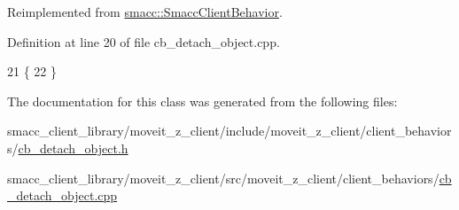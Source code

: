 Reimplemented from \hyperlink{classsmacc_1_1SmaccClientBehavior_ac0cd72d42bd00425362a97c9803ecce5}{smacc\+::\+Smacc\+Client\+Behavior}.



Definition at line 20 of file cb\+\_\+detach\+\_\+object.\+cpp.


\begin{DoxyCode}
21     \{
22     \}
\end{DoxyCode}


The documentation for this class was generated from the following files\+:\begin{DoxyCompactItemize}
\item 
smacc\+\_\+client\+\_\+library/moveit\+\_\+z\+\_\+client/include/moveit\+\_\+z\+\_\+client/client\+\_\+behaviors/\hyperlink{cb__detach__object_8h}{cb\+\_\+detach\+\_\+object.\+h}\item 
smacc\+\_\+client\+\_\+library/moveit\+\_\+z\+\_\+client/src/moveit\+\_\+z\+\_\+client/client\+\_\+behaviors/\hyperlink{cb__detach__object_8cpp}{cb\+\_\+detach\+\_\+object.\+cpp}\end{DoxyCompactItemize}
